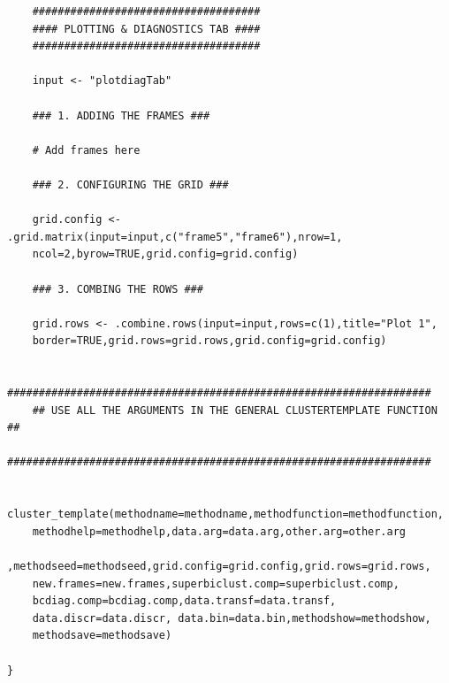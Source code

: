 \documentclass[a4paper]{article}\usepackage[]{graphicx}\usepackage[]{color}
\begin{document}
\begin{verbatim}
	####################################
	#### PLOTTING & DIAGNOSTICS TAB ####
	####################################
	
	input <- "plotdiagTab"
		
	### 1. ADDING THE FRAMES ###
	
	# Add frames here
	
	### 2. CONFIGURING THE GRID ###
	
	grid.config <- .grid.matrix(input=input,c("frame5","frame6"),nrow=1,
    ncol=2,byrow=TRUE,grid.config=grid.config)
		
	### 3. COMBING THE ROWS ###
	
	grid.rows <- .combine.rows(input=input,rows=c(1),title="Plot 1",
    border=TRUE,grid.rows=grid.rows,grid.config=grid.config)
		
	###################################################################
	## USE ALL THE ARGUMENTS IN THE GENERAL CLUSTERTEMPLATE FUNCTION ##
	###################################################################
	
	cluster_template(methodname=methodname,methodfunction=methodfunction,
    methodhelp=methodhelp,data.arg=data.arg,other.arg=other.arg
    ,methodseed=methodseed,grid.config=grid.config,grid.rows=grid.rows,
    new.frames=new.frames,superbiclust.comp=superbiclust.comp,
    bcdiag.comp=bcdiag.comp,data.transf=data.transf,
    data.discr=data.discr, data.bin=data.bin,methodshow=methodshow,
    methodsave=methodsave)
	
}
\end{verbatim}
\end{document}
